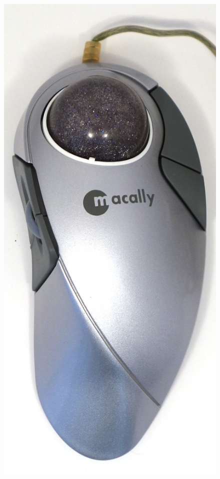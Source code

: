 \documentclass[11pt, a4paper]{article}
\begin{document}
\begin{figure}[h]
    \centering
    \includegraphics[scale=0.45]{2001_macally_qball/top_30.jpg}

\end{figure}
\end{document}
